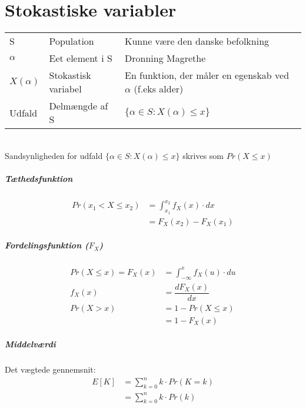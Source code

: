 \documentclass[Main]{subfiles}
\begin{document}
\chapter{Stokastiske variabler}

\begin{tabular}{lll}
S	& Population & Kunne være den danske befolkning\\
$\alpha$ 	& Eet element i S & Dronning Magrethe\\
$X(\alpha)$ & Stokastisk variabel & En funktion, der måler en egenskab ved $\alpha$ (f.eks alder)\\
Udfald & Delmængde af S & $\{ \alpha \in S:X(\alpha) \leq x \}$
\end{tabular}
\\
Sandsynligheden for udfald $\{ \alpha \in S:X(\alpha) \leq x \}$ skrives som $Pr(X \leq x)$

\paragraph{Tæthedsfunktion}
\begin{align*}
Pr(x_1 < X \leq x_2) &= \int_{x_1}^{x_2} f_X(x)\cdot dx \\
	&= F_X(x_2) - F_X(x_1)
\end{align*}


\paragraph{Fordelingsfunktion ($F_X$)}
\begin{align*}
Pr(X \leq x) = F_X(x) &= \int_{-\infty}^x f_X(u) \cdot du\\
f_X(x) &= \dfrac{d F_X(x)}{dx}\\
Pr( X > x) &= 1- Pr(X \leq x)\\
	&= 1- F_X(x)
\end{align*}



\paragraph{Middelværdi}
Det vægtede gennemsnit:
\begin{align*}
E[K] &= \sum_{k=0}^n k\cdot Pr(K=k)\\
	&= \sum_{k=0}^n k\cdot Pr(k)
\end{align*}
\end{document}
